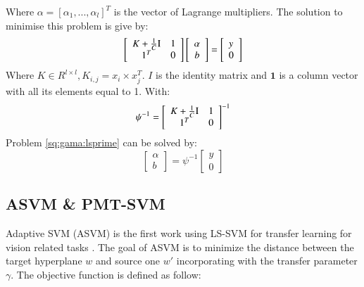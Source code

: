Where $\alpha = [ \alpha_1,...,\alpha_l]^T $ is the vector of Lagrange multipliers. The solution to minimise this problem is give by:
\begin{equation}\label{eq:single:orgmatrix}
  \left[ {\begin{array}{*{20}{c}}
{K  + \frac{1}{C}{\rm I}}\\
1^T
\end{array}\begin{array}{*{20}{c}}
1\\
0
\end{array}} \right]\left[ {\begin{array}{*{20}{c}}
\alpha \\
b
\end{array}} \right] = \left[ \begin{array}{l}
y\\
0
\end{array} \right]
\end{equation}
Where $K \in R^{l \times l},K_{i,j}=x_i \times x_j^T$. $I$ is the identity matrix and $\mathbf{1}$ is a column vector with all its elements equal to 1. With:
\begin{equation}\label{eq:gama:psi}
\psi^{-1} = \left[ {\begin{array}{*{20}{c}}
{K  + \frac{1}{C}{\rm I}}\\
1^T
\end{array}\begin{array}{*{20}{c}}
1\\
0
\end{array}} \right]^{-1}
\end{equation}
Problem \eqref{sq:gama:lsprime} can be solved by:
\begin{equation}
\left[ {\begin{array}{*{20}{c}}
\alpha \\
b
\end{array}} \right] = \psi^{-1}\left[ \begin{array}{l}
y\\
0
\end{array} \right]
\end{equation}
\subsection{ASVM \& PMT-SVM}
Adaptive SVM (ASVM) is the first work using LS-SVM for transfer learning for vision related tasks \cite{yang2007adapting}. The goal of ASVM is to minimize the distance between the target hyperplane $w$ and source one $w'$ incorporating with the transfer parameter $\gamma$. The objective function is defined as follow:


